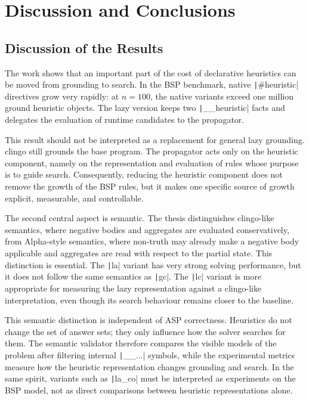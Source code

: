\section{Discussion and Conclusions}

\subsection{Discussion of the Results}

The work shows that an important part of the cost of declarative heuristics can be moved from grounding to search. In the BSP benchmark, native \texttt|#heuristic| directives grow very rapidly: at $n=100$, the native variants exceed one million ground heuristic objects. The lazy version keeps two \texttt|__heuristic| facts and delegates the evaluation of runtime candidates to the propagator.

This result should not be interpreted as a replacement for general lazy grounding. clingo still grounds the base program. The propagator acts only on the heuristic component, namely on the representation and evaluation of rules whose purpose is to guide search. Consequently, reducing the heuristic component does not remove the growth of the BSP rules, but it makes one specific source of growth explicit, measurable, and controllable.

The second central aspect is semantic. The thesis distinguishes clingo-like semantics, where negative bodies and aggregates are evaluated conservatively, from Alpha-style semantics, where non-truth may already make a negative body applicable and aggregates are read with respect to the partial state. This distinction is essential. The \texttt|la| variant has very strong solving performance, but it does not follow the same semantics as \texttt|gc|. The \texttt|lc| variant is more appropriate for measuring the lazy representation against a clingo-like interpretation, even though its search behaviour remains closer to the baseline.

This semantic distinction is independent of ASP correctness. Heuristics do not change the set of answer sets; they only influence how the solver searches for them. The semantic validator therefore compares the visible models of the problem after filtering internal \texttt|__...| symbols, while the experimental metrics measure how the heuristic representation changes grounding and search. In the same spirit, variants such as \texttt|la_co| must be interpreted as experiments on the BSP model, not as direct comparisons between heuristic representations alone.

